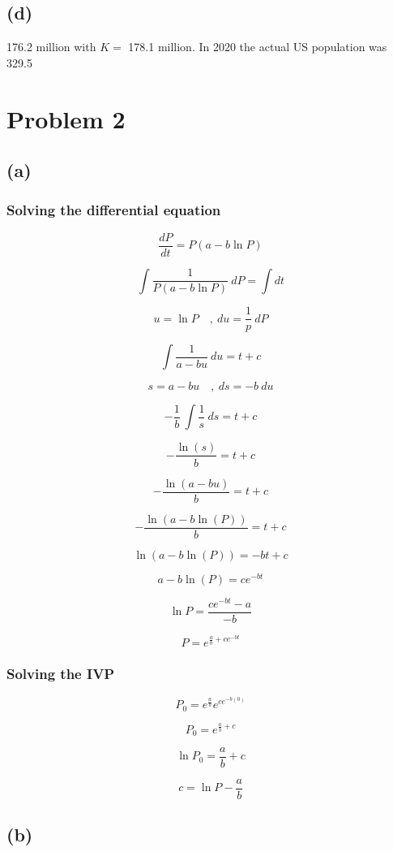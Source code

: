 \documentclass[a4paper, british]{article}
\begin{document}
\subsection*{(d)}

176.2 million with \(K =\) 178.1 million. In 2020 the actual US population was 329.5

\section{Problem 2}

\subsection*{(a)}

\subsubsection*{Solving the differential equation}

\[\frac{dP}{dt} = P(a-b\ln P)\]

\[\int \frac{1}{P(a-b\ln P)}\ dP = \int dt\]

\[u = \ln P \quad ,\ du = \frac{1}{p}\ dP\]

\[\int \frac{1}{a-bu}\ du = t + c\]

\[s = a-bu \quad ,\ ds = -b\ du\]

\[-\frac{1}{b}\ \int \frac{1}{s}\ ds = t+c\]

\[- \frac{\ln (s)}{b} = t+c\]

\[- \frac{\ln (a-bu)}{b} = t + c\]

\[- \frac{\ln (a-b \ln (P))}{b} = t + c\]

\[\ln (a-b \ln (P)) = -bt + c\]

\[a-b \ln (P) = ce^{-bt}\]

\[\ln P = \frac{ce^{-bt}-a}{-b}\]

\[P = e^{\frac{a}{b} + ce^{-bt}}\]

\subsubsection*{Solving the IVP}

\[P_0 = e^{\frac{a}{b}} e^{ce^{-b(0)}}\]

\[P_0 = e^{\frac{a}{b}+c}\]

\[\ln P_0 = \frac{a}{b} + c\]

\[c = \ln P - \frac{a}{b}\]

\subsection*{(b)}
\end{document}
